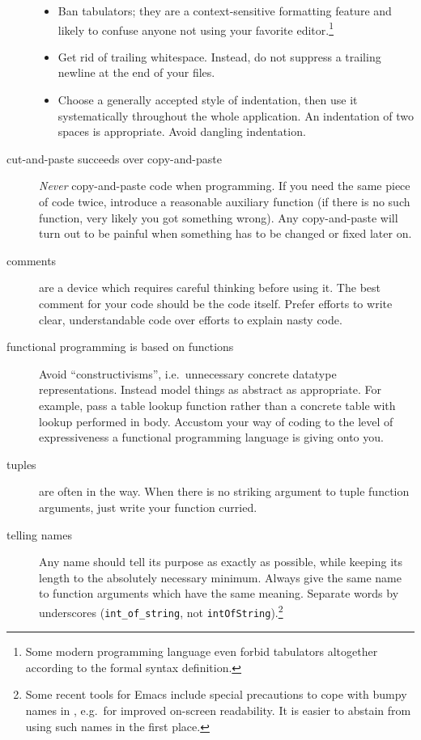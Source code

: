 \begin{isabellebody}
\begin{isamarkuptext}
\begin{description}
\begin{itemize}
        \item Ban tabulators; they are a context-sensitive formatting
          feature and likely to confuse anyone not using your favorite
          editor.\footnote{Some modern programming language even
          forbid tabulators altogether according to the formal syntax
          definition.}

        \item Get rid of trailing whitespace.  Instead, do not
          suppress a trailing newline at the end of your files.

        \item Choose a generally accepted style of indentation,
          then use it systematically throughout the whole
          application.  An indentation of two spaces is appropriate.
          Avoid dangling indentation.

      \end{itemize}

    \item[cut-and-paste succeeds over copy-and-paste]
       \emph{Never} copy-and-paste code when programming.  If you
        need the same piece of code twice, introduce a
        reasonable auxiliary function (if there is no
        such function, very likely you got something wrong).
        Any copy-and-paste will turn out to be painful 
        when something has to be changed or fixed later on.

    \item[comments]
      are a device which requires careful thinking before using
      it.  The best comment for your code should be the code itself.
      Prefer efforts to write clear, understandable code
      over efforts to explain nasty code.

    \item[functional programming is based on functions]
      Avoid ``constructivisms'', i.e.\ unnecessary concrete datatype
      representations.  Instead model things as abstract as
      appropriate.  For example, pass a table lookup function rather
      than a concrete table with lookup performed in body.  Accustom
      your way of coding to the level of expressiveness a functional
      programming language is giving onto you.

    \item[tuples]
      are often in the way.  When there is no striking argument
      to tuple function arguments, just write your function curried.

    \item[telling names]
      Any name should tell its purpose as exactly as possible, while
      keeping its length to the absolutely necessary minimum.  Always
      give the same name to function arguments which have the same
      meaning. Separate words by underscores (\verb|int_of_string|, not \verb|intOfString|).\footnote{Some
      recent tools for Emacs include special precautions to cope with
      bumpy names in , e.g.\ for improved on-screen
      readability.  It is easier to abstain from using such names in the
      first place.}


\end{description}
\end{isamarkuptext}
\end{isabellebody}
